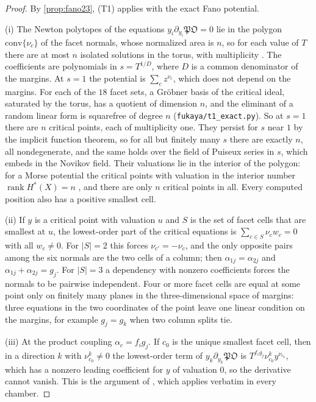 \documentclass[11pt]{article}
\theoremstyle{definition}
\theoremstyle{remark}
\begin{document}
\begin{proof}
By \cref{prop:fano23}, (T1) applies with the exact Fano potential.

(i) The Newton polytopes of the equations $y_i\partial_{y_i}\mathfrak{PO}=0$ lie in the polygon $\mathrm{conv}\{\nu_c\}$ of the facet normals, whose
normalized area is $n$, so for each value of $T$ there are at most $n$ isolated solutions in the torus, with multiplicity \cite{Bernstein1975}. The
coefficients are polynomials in $s=T^{1/D}$, where $D$ is a common denominator of the margins. At $s=1$ the potential is $\sum_{c}z^{\nu_c}$, which
does not depend on the margins. For each of the $18$ facet sets, a Gröbner basis of the critical ideal, saturated by the torus, has a quotient
of dimension $n$, and the eliminant of a random linear form is squarefree of degree $n$ (\texttt{fukaya/t1\_exact.py}). So at $s=1$ there are $n$
critical points, each of multiplicity one. They persist for $s$ near $1$ by the implicit function theorem, so for all but finitely many $s$
there are exactly $n$, all nondegenerate, and the same holds over the field of Puiseux series in $s$, which embeds in the Novikov field.
Their valuations lie in the interior of the polygon: for a Morse potential the critical points with valuation in the interior number
$\operatorname{rank}H^*(X)=n$ \cite{ChoOh2006}, and there are only $n$ critical points in all. Every computed position also has a positive smallest cell.

(ii) If $y$ is a critical point with valuation $u$ and $S$ is the set of facet cells that are smallest at $u$, the lowest-order part of the critical
equations is $\sum_{c\in S}\nu_cw_c=0$ with all $w_c\ne0$. For $\lvert S\rvert=2$ this forces $\nu_{c'}=-\nu_c$, and the only opposite pairs among the
six normals are the two cells of a column; then $\alpha_{1j}=\alpha_{2j}$ and $\alpha_{1j}+\alpha_{2j}=g_j$. For $\lvert S\rvert=3$ a dependency with
nonzero coefficients forces the normals to be pairwise independent. Four or more facet cells are equal at some point only on finitely many planes in the
three-dimensional space of margins: three equations in the two coordinates of the point leave one linear condition on the margins, for example
$g_j=g_k$ when two column splits tie.

(iii) At the product coupling $\alpha_c=f_ig_j$. If $c_0$ is the unique smallest facet cell, then in a direction $k$ with $\nu_{c_0}^k\ne0$ the
lowest-order term of $y_k\partial_{y_k}\mathfrak{PO}$ is $T^{f_ig_j}\nu^k_{c_0}y^{\nu_{c_0}}$, which has a nonzero leading coefficient for $y$ of
valuation $0$, so the derivative cannot vanish. This is the argument of \cite[Prop.~10.11]{Conditionals}, which applies verbatim in every chamber.


\end{proof}
\end{document}
